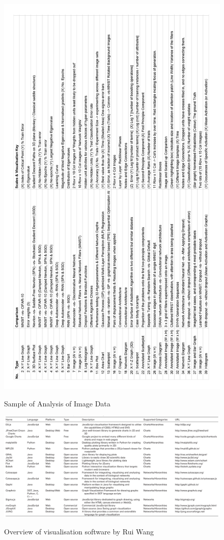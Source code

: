 \documentclass[a4paper,11pt,titlepage]{article}
\begin{document}
		
		\begin{figure}[H]
    			\centering	
		{{\includegraphics[width=14cm]
    				{img/exploration_data_rotate} 
    			}}%
    			\caption{Sample of Analysis of Image Data}%
    		\label{fig:studentprofile}
		\end{figure}
		
		\clearpage
				
		\begin{figure}[H]
    			\centering	
		{{\includegraphics[width=18cm]
    				{img/rui_wang_vis_overview} 
    			}}%
    			\caption{Overview of visualisation software by Rui Wang}%
    		\label{fig:studentprofile}
		\end{figure}
\end{document}
